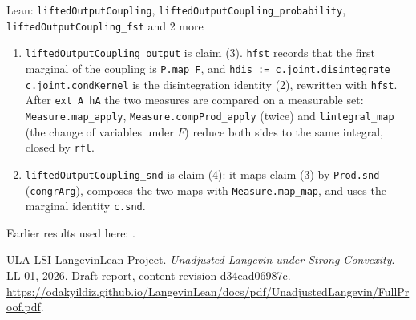 \documentclass[11pt,a4paper]{article}
\begin{document}
\begin{leanbox}{Lean: \texttt{liftedOutputCoupling}, \texttt{liftedOutputCoupling\_\allowbreak{}probability}, \texttt{liftedOutputCoupling\_\allowbreak{}fst} and 2 more}
\begin{enumerate}
\item \texttt{lifted\allowbreak{}Output\allowbreak{}Coupling\_\allowbreak{}output} is claim (3). \texttt{hfst} records that the first marginal of the coupling is \texttt{P.\allowbreak{}map F}, and \texttt{hdis := c.\allowbreak{}joint.\allowbreak{}disintegrate c.\allowbreak{}joint.\allowbreak{}cond\allowbreak{}Kernel} is the disintegration identity (2), rewritten with \texttt{hfst}. After \texttt{ext A h\allowbreak{}A} the two measures are compared on a measurable set: \texttt{Measure.\allowbreak{}map\_\allowbreak{}apply}, \texttt{Measure.\allowbreak{}comp\allowbreak{}Prod\_\allowbreak{}apply} (twice) and \texttt{lintegral\_\allowbreak{}map} (the change of variables under \(F\)) reduce both sides to the same integral, closed by \texttt{rfl}.

\item \texttt{lifted\allowbreak{}Output\allowbreak{}Coupling\_\allowbreak{}snd} is claim (4): it maps claim (3) by \texttt{Prod.\allowbreak{}snd} (\texttt{congr\allowbreak{}Arg}), composes the two maps with \texttt{Measure.\allowbreak{}map\_\allowbreak{}map}, and uses the marginal identity \texttt{c.\allowbreak{}snd}.

\end{enumerate}
\end{leanbox}


Earlier results used here: \cite[Section~3.17.1]{LangevinLean2026ULASC}.

\begin{thebibliography}{ULA-LSI}
LangevinLean Project. \emph{Unadjusted Langevin under Strong Convexity}. LL-01, 2026. Draft report, content revision d34ead06987c. \url{https://odakyildiz.github.io/LangevinLean/docs/pdf/UnadjustedLangevin/FullProof.pdf}.
\end{thebibliography}
\end{document}
